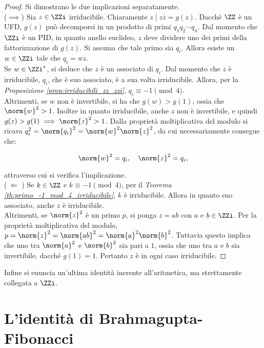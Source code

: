 \begin{proof} Si dimostrano le due implicazioni separatamente. \\

    ($\implies$)\; Sia $z \in \ZZi$ irriducibile. Chiaramente
    $z \mid z \overline{z} = g(z)$. Dacché $\ZZ$ è un UFD,
    $g(z)$ può decomporsi in un prodotto di primi $q_1q_2\cdots q_n$.
    Dal momento che $\ZZi$ è un PID, in quanto anello euclideo,
    $z$ deve dividere uno dei primi della fattorizzazione di
    $g(z)$. Si assuma che tale primo sia $q_i$. Allora esiste
    un $w \in \ZZi$ tale che $q_i=wz$. \\

    Se $w \in \ZZi^*$, si
    deduce che $z$ è un associato di $q_i$. Dal momento che
    $z$ è irriducibile, $q_i$, che è suo associato, è a sua
    volta irriducibile. Allora, per la \textit{Proposizione \ref{prop:irriducibili_zz_zzi}}, $q_i \equiv -1 \pmod4$.
    \\

    Altrimenti, se $w$ non è invertibile, si ha che $g(w)>g(1)$,
    ossia che $\norm{w}^2>1$. Inoltre in quanto irriducibile, anche
    $z$ non è invertibile, e quindi
    $g(z)>g(1) \implies \norm{z}^2>1$. Dalla proprietà
    moltiplicativa
    del modulo si ricava $q_i^2 = \norm{q_i}^2 = \norm{w}^2 \norm{z}^2$,
    da cui necessariamente consegue che:

    \[ \norm{w}^2=q_i, \quad \norm{z}^2=q_i, \]

    attraverso cui si verifica l'implicazione. \\

    ($\,\Longleftarrow\,\,$)\; Se $k \in \ZZ$ e $k \equiv -1 \pmod4$, per
    il \textit{Teorema \ref{th:primo_-1_mod_4_irriducibile}}, $k$ è
    irriducibile. Allora in quanto suo associato, anche $z$ è irriducibile. \\

    Altrimenti, se $\norm{z}^2$ è un primo $p$, si ponga
    $z=ab$ con $a$ e $b \in \ZZi$. Per la proprietà moltiplicativa
    del modulo, $p = \norm{z}^2 = \norm{ab}^2 = \norm{a}^2\norm{b}^2$.
    Tuttavia questo implica che uno tra $\norm{a}^2$ e $\norm{b}^2$
    sia pari a $1$, ossia che uno tra $a$ e $b$ sia invertibile,
    dacché $g(1)=1$. Pertanto $z$ è in ogni caso irriducibile.
\end{proof}

Infine si enuncia un'ultima identità inerente all'aritmetica, ma
strettamente collegata a $\ZZi$.

\section{L'identità di Brahmagupta-Fibonacci}

